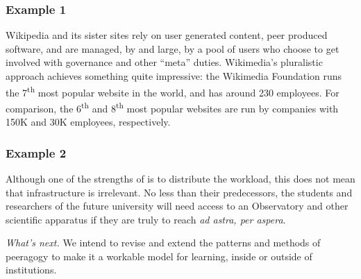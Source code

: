 \subsubsection*{Example 1} Wikipedia and its sister sites rely on user generated content,
peer produced software, and are managed, by and large, by a pool of users who choose to
get involved with governance and other ``meta'' duties.
%
Wikimedia's pluralistic approach achieves something quite impressive: the
Wikimedia Foundation runs the 7\textsuperscript{th} most popular
website in the world, and has around 230 employees.  For comparison,
the 6\textsuperscript{th} and 8\textsuperscript{th} most popular
websites are run by companies with 150K and 30K employees,
respectively.

\subsubsection*{Example 2} Although one of the strengths of  is to
distribute the workload, this does not mean that infrastructure is
irrelevant.  No less than their predecessors, the students and
researchers of the future university will need access to an
Observatory and other scientific apparatus if they are truly to reach \emph{ad astra, per aspera}.

\begin{framed}
\noindent 
\emph{What's next.} We intend to revise and extend the patterns and methods of peeragogy to make it a workable model for learning, inside or outside of institutions.
\end{framed}



  

  
  
  
  
  
  
  

